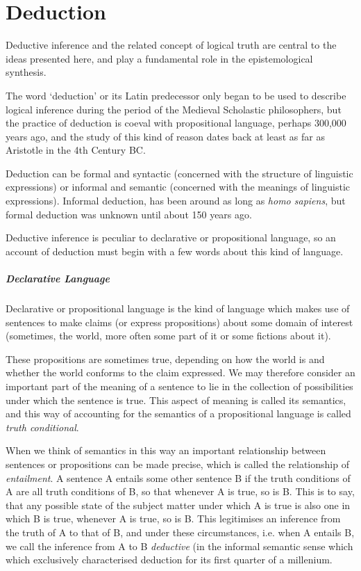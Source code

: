 \documentclass[10pt,titlepage]{book}
\begin{document}
\chapter{Deduction}\label{ChapDeduction}

Deductive inference and the related concept of logical truth are central to the ideas presented here, and play a fundamental role in the epistemological synthesis.

The word `deduction' or its Latin predecessor only began to be used to describe logical inference during the period of the Medieval Scholastic philosophers, but the practice of deduction is coeval with propositional language, perhaps 300,000 years ago, and the study of this kind of reason dates back at least as far as Aristotle in the 4th Century BC.

Deduction can be formal and syntactic (concerned with the structure of linguistic expressions)  or informal and semantic (concerned with the meanings of linguistic expressions).
Informal deduction, has been around as long as \emph{homo sapiens}, but formal deduction was unknown until about 150 years ago.

Deductive inference is peculiar to declarative or propositional language, so an account of deduction must begin with a few words about this kind of language.

\paragraph{Declarative Language}

Declarative or propositional language is the kind of language which makes use of sentences to make claims (or express propositions) about some domain of interest (sometimes, the world, more often some part of it or some fictions about it).

These propositions are sometimes true, depending on how the world is and whether the world conforms to the claim expressed.
We may therefore consider an important part of the meaning of a sentence to lie in the collection of possibilities under which the sentence is true.
This aspect of meaning is called its semantics, and this way of accounting for the semantics of a propositional language is called \emph{truth conditional}.

When we think of semantics in this way an important relationship between sentences or propositions can be made precise, which is called the relationship of \emph{entailment}.
A sentence A entails some other sentence B if the truth conditions of A are all truth conditions of B, so that whenever A is true, so is B.
This is to say, that any possible state of the subject matter under which A is true is also one in which B is true, whenever A is true, so is B.
This legitimises an inference from the truth of A to that of B, and under these circumstances, i.e. when A entails B, we call the inference from A to B \emph{deductive} (in the informal semantic sense which which exclusively characterised deduction for its first quarter of a millenium.
\end{document}
